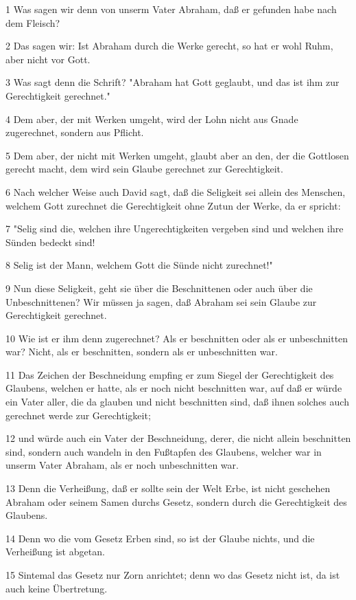 \par 1 Was sagen wir denn von unserm Vater Abraham, daß er gefunden habe nach dem Fleisch?
\par 2 Das sagen wir: Ist Abraham durch die Werke gerecht, so hat er wohl Ruhm, aber nicht vor Gott.
\par 3 Was sagt denn die Schrift? "Abraham hat Gott geglaubt, und das ist ihm zur Gerechtigkeit gerechnet."
\par 4 Dem aber, der mit Werken umgeht, wird der Lohn nicht aus Gnade zugerechnet, sondern aus Pflicht.
\par 5 Dem aber, der nicht mit Werken umgeht, glaubt aber an den, der die Gottlosen gerecht macht, dem wird sein Glaube gerechnet zur Gerechtigkeit.
\par 6 Nach welcher Weise auch David sagt, daß die Seligkeit sei allein des Menschen, welchem Gott zurechnet die Gerechtigkeit ohne Zutun der Werke, da er spricht:
\par 7 "Selig sind die, welchen ihre Ungerechtigkeiten vergeben sind und welchen ihre Sünden bedeckt sind!
\par 8 Selig ist der Mann, welchem Gott die Sünde nicht zurechnet!"
\par 9 Nun diese Seligkeit, geht sie über die Beschnittenen oder auch über die Unbeschnittenen? Wir müssen ja sagen, daß Abraham sei sein Glaube zur Gerechtigkeit gerechnet.
\par 10 Wie ist er ihm denn zugerechnet? Als er beschnitten oder als er unbeschnitten war? Nicht, als er beschnitten, sondern als er unbeschnitten war.
\par 11 Das Zeichen der Beschneidung empfing er zum Siegel der Gerechtigkeit des Glaubens, welchen er hatte, als er noch nicht beschnitten war, auf daß er würde ein Vater aller, die da glauben und nicht beschnitten sind, daß ihnen solches auch gerechnet werde zur Gerechtigkeit;
\par 12 und würde auch ein Vater der Beschneidung, derer, die nicht allein beschnitten sind, sondern auch wandeln in den Fußtapfen des Glaubens, welcher war in unserm Vater Abraham, als er noch unbeschnitten war.
\par 13 Denn die Verheißung, daß er sollte sein der Welt Erbe, ist nicht geschehen Abraham oder seinem Samen durchs Gesetz, sondern durch die Gerechtigkeit des Glaubens.
\par 14 Denn wo die vom Gesetz Erben sind, so ist der Glaube nichts, und die Verheißung ist abgetan.
\par 15 Sintemal das Gesetz nur Zorn anrichtet; denn wo das Gesetz nicht ist, da ist auch keine Übertretung.
